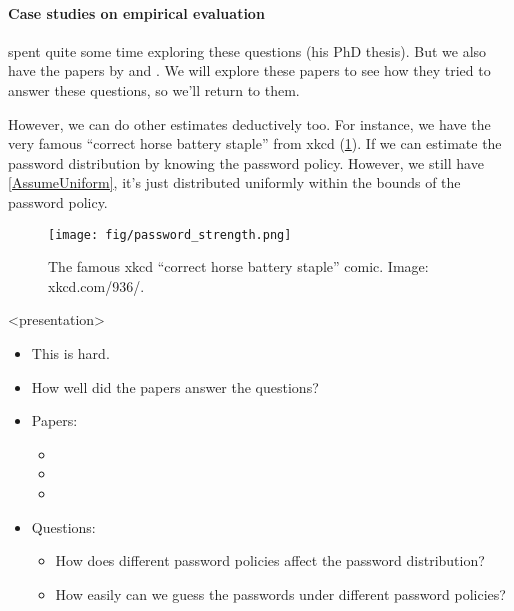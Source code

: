 \paragraph{Case studies on empirical evaluation}

\Textcite{GuessingHumanChosenSecrets2012} spent quite some time exploring these 
questions (his PhD thesis).
But we also have the papers by
\textcite{OfPasswordsAndPeople} and
\textcite{CanLongPasswordsBeSecureAndUsable}.
We will explore these papers to see how they tried to answer these questions, 
so we'll return to them.

However, we can do other estimates deductively too.
For instance, we have the very famous \enquote{correct horse battery staple} 
from xkcd (\cref{xkcd936}).
If we can estimate the password distribution by knowing the password policy.
However, we still have \cref{AssumeUniform}, it's just distributed uniformly 
within the bounds of the password policy.

\begin{frame}
  \begin{figure}[h]
    \centering
    \texttt{[image: fig/password\_strength.png]}
    \caption{%
      The famous xkcd \enquote{correct horse battery staple} comic.
      Image: xkcd.com/936/.
    }\label{xkcd936}
  \end{figure}
\end{frame}

\begin{frame}<presentation>
  \begin{remark}
    \begin{itemize}
      \item This is hard.
    \end{itemize}
  \end{remark}

  \begin{exercise}
    \begin{itemize}
      \item How well did the papers answer the questions?
      \item Papers:
        \begin{itemize}
          \item {}
          \item {}
          \item {}
        \end{itemize}
      \item Questions:
        \begin{itemize}
          \item How does different password policies affect the password 
            distribution?
          \item How easily can we guess the passwords under different password 
            policies?
        \end{itemize}
    \end{itemize}
  \end{exercise}
\end{frame}

